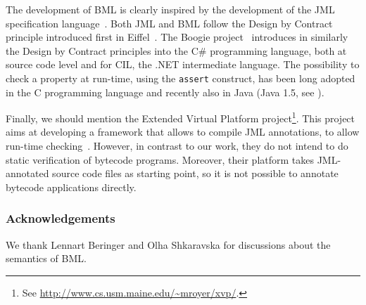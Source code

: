 The development of BML is clearly inspired by the development of the
JML specification language~\cite{JMLReferenceManual05}. Both JML and
BML follow the Design by Contract principle introduced first in
Eiffel~\cite{Meyer97}. The Boogie project~\cite{BarnettCDJL05}
introduces in similarly the Design by Contract principles into the C\#
programming language, both at source code level and for CIL, the .NET
intermediate language.  The possibility to check a property at
run-time, using the \texttt{assert} construct, has been long 
adopted in the C programming language and recently also in Java (Java
1.5, see \cite[\S 14.10]{JLS}). 

Finally, we should mention the Extended Virtual Platform
project\footnote{See
\url{http://www.cs.usm.maine.edu/~mroyer/xvp/}.}. This project aims at
developing a framework that allows to compile JML annotations, to
allow run-time checking~\cite{AlagicXVP05}. However, in contrast to
our work, they do not intend to do static verification of bytecode
programs. Moreover, their platform takes JML-annotated source code
files as starting point, so it is not possible to annotate bytecode
applications directly.


\subsubsection*{Acknowledgements}
We thank Lennart Beringer and Olha Shkaravska for discussions about
the semantics of BML. 
\vspace*{-.5em}
